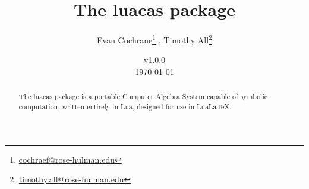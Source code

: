 \documentclass{article}
\begin{document}
\title{The {\ttfamily luacas} package}
\author{Evan Cochrane\thanks{\href{mailto:cochraef@rose-hulman.edu}{\ttfamily cochraef@rose-hulman.edu}} , Timothy All\thanks{\href{mailto:timothy.all@rose-hulman.edu}{\ttfamily timothy.all@rose-hulman.edu}}}
\date{v1.0.0 \\ \today} 

\maketitle 

\begin{abstract}
    The {\ttfamily luacas} package is a portable Computer Algebra System capable of symbolic computation, written entirely in Lua, designed for use in Lua\LaTeX{}.
\end{abstract}

\tableofcontents

















 

 













\appendix



\newpage

\printindex
\end{document}
